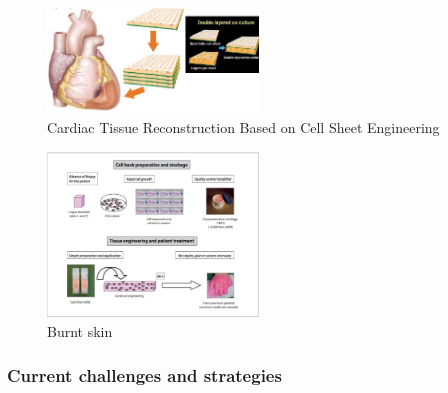     \begin{figure}[H]
            \centering
            \includegraphics[width=0.5\textwidth]{cardiac_sheet.png}
            \caption{\label{fig:cardiac_sheet} Cardiac Tissue Reconstruction Based on Cell Sheet Engineering}
    \end{figure}

    \begin{figure}[H]
            \centering
            \includegraphics[width=0.5\textwidth]{cell_bank.png}
            \caption{\label{fig:cell_bank} Burnt skin}
    \end{figure}

        \subsubsection{Current challenges and strategies}

